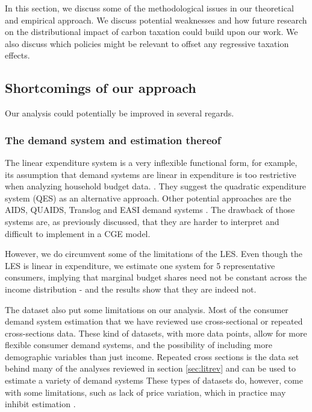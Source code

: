 In this section, we discuss some of the methodological issues in our theoretical and empirical approach. We discuss potential weaknesses and how future research on the distributional impact of carbon taxation could build upon our work. We also discuss which policies might be relevant to offset any regressive taxation effects. 

    

\subsection{Shortcomings of our approach}
Our analysis could potentially be improved in several regards. 

\subsubsection{The demand system and estimation thereof}
The linear expenditure system is a very inflexible functional form, for example, its assumption that demand systems are linear in expenditure is too restrictive when analyzing household budget data. \citep[p. 30]{pollak1969estimation}. They suggest the quadratic expenditure system (QES) as an alternative approach. Other potential approaches are the AIDS, QUAIDS, Translog and EASI demand systems \citep{shojaeddiniconsumer}. The drawback of those systems are, as previously discussed, that they are harder to interpret and difficult to implement in a CGE model. 

However, we do circumvent some of the limitations of the LES. Even though the LES is linear in expenditure, we estimate one system for 5 representative consumers, implying that marginal budget shares need not be constant across the income distribution - and the results show that they are indeed not. 

The dataset also put some limitations on our analysis. Most of the consumer demand system estimation that we have reviewed use cross-sectional or repeated cross-sections data. These kind of datasets, with more data points, allow for more flexible consumer demand systems, and the possibility of including more demographic variables than just income. Repeated cross sections is the data set behind many of the analyses reviewed in section \ref{sec:litrev} and can be used to estimate a variety of demand systems  \citep{shojaeddiniconsumer, schulte2017price, harold2017incomeelasticityenergy} These types of datasets do, however, come with some limitations, such as lack of price variation, which in practice may inhibit estimation \citep{jussila2012estimation}. 

